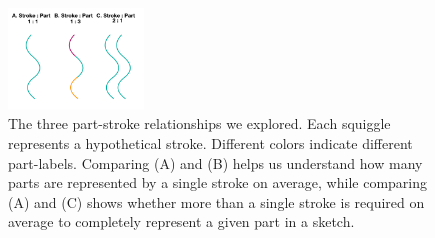 \documentclass[10pt,letterpaper]{article}
\begin{document}
\begin{figure}[htbp]
\centering
\includegraphics[width=0.32\textwidth]{figures/Part-Stroke.png}
\caption{The three part-stroke relationships we explored. Each squiggle represents a hypothetical stroke. 
Different colors indicate different part-labels.
Comparing (A) and (B) helps us understand how many parts are represented by a single stroke on average, 
while comparing (A) and (C) shows whether more than a single stroke is required on average to completely represent a given part in a sketch. }
\end{figure}
\end{document}
